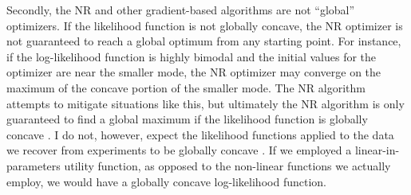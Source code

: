 \documentclass[../main.tex]{subfiles}
\begin{document}
Secondly, the NR and other gradient-based algorithms are not \enquote{global} optimizers.
If the likelihood function is not globally concave, the NR optimizer is not guaranteed to reach a global optimum from any starting point.
For instance, if the log-likelihood function is highly bimodal and the initial values for the optimizer are near the smaller mode, the NR optimizer may converge on the maximum of the concave portion of the smaller mode.
The NR algorithm attempts to mitigate situations like this{\footnotemark}, but ultimately the NR algorithm is only guaranteed to find a global maximum if the likelihood function is globally concave \parencite[218]{Train2002}.
I do not, however, expect the likelihood functions applied to the data we recover from experiments to be globally concave \parencite[227]{Train2002}.
If we employed a linear-in-parameters utility function, as opposed to the non-linear functions we actually employ, we would have a globally concave log-likelihood function.

\addtocounter{footnote}{-1}

\end{document}
